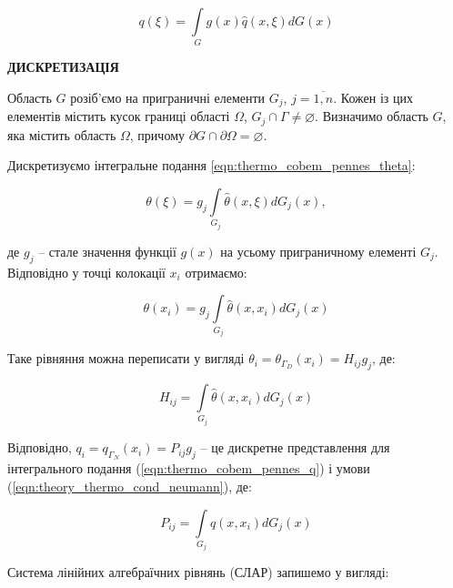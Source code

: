 \begin{equation}
  \label{eqn:thermo_cobem_pennes_q}
  q(\xi) = \int \limits_G g(x)\hat{q}(x,\xi)dG(x)
\end{equation}

\begin{center}
  \textbf{ДИСКРЕТИЗАЦІЯ}
\end{center}

Область $G$ розіб'ємо на приграничні елементи $G_j$, $j=\overline{1,n}$. Кожен із цих елементів містить кусок границі
області $\Omega$, $G_j \cap \Gamma \neq \varnothing$. Визначимо область $G$, яка містить область $\Omega$, причому
$\partial G \cap \partial \Omega = \varnothing$.

Дискретизуємо інтегральне подання \ref{eqn:thermo_cobem_pennes_theta}:

\begin{equation}
  \label{eqn:thermo_cobem_pennes_theta_discrete}
  \theta(\xi) = g_j \int \limits_{G_j} \hat{\theta}(x,\xi)dG_j(x),
\end{equation}

\noindent де $g_j$ -- стале значення функції $g(x)$ на усьому пригранич­ному елементі $G_j$. Відповідно у точці
колокації $x_i$ отримаємо:

\begin{equation*}
  \theta(x_i) = g_j \int \limits_{G_j} \hat{\theta}(x,x_i)dG_j(x)
\end{equation*}

\noindent Таке рівняння можна переписати у вигляді $\theta_i = \theta_{\Gamma_D}(x_i) = H_{ij} g_j$, де: 

\begin{equation*}
  H_{ij} = \int \limits_{G_j} \hat{\theta}(x,x_i)dG_j(x)
\end{equation*}

\noindent Відповідно, $q_i = q_{\Gamma_N}(x_i) = P_{ij} g_j$ -- це дискретне представлення для інтегрального подання
(\ref{eqn:thermo_cobem_pennes_q}) і умови (\ref{eqn:theory_thermo_cond_neumann}), де:

\begin{equation*}
  P_{ij} = \int \limits_{G_j} \hat{q}(x,x_i)dG_j(x)
\end{equation*}

Система лінійних алгебраїчних рівнянь (СЛАР) запишемо у вигляді:

